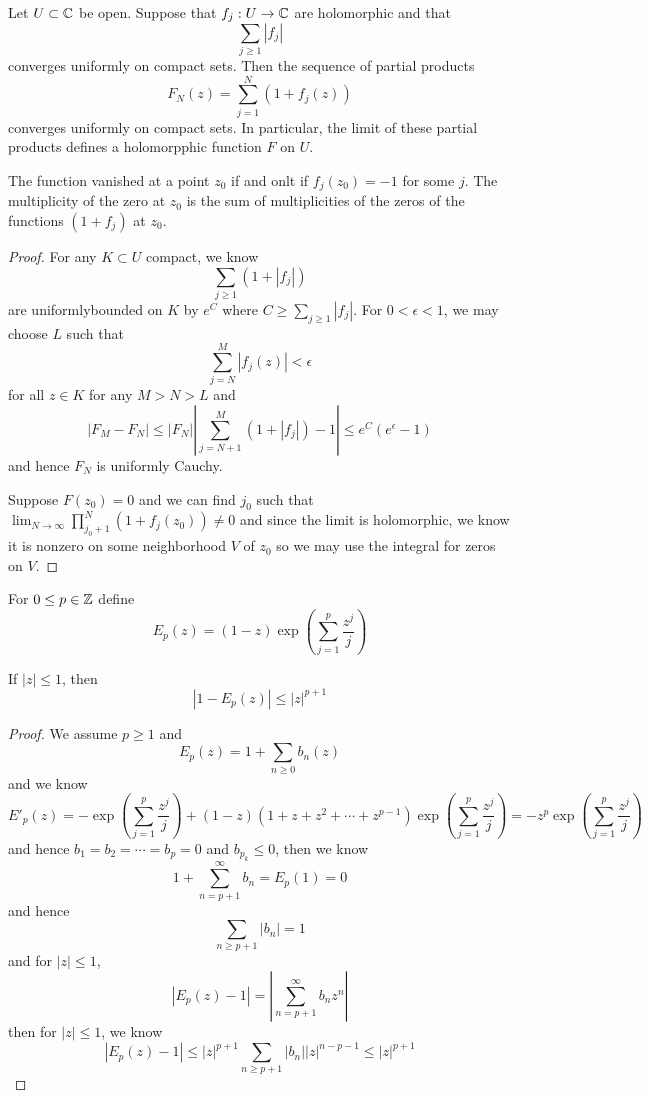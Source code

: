 \begin{theorem}
    Let $U\subset \mathbb{C}$ be open. Suppose that $f_j : U\to\mathbb{C}$ are holomorphic and that
    \[\sum\limits_{j\geq 1}|f_j|\]
    converges uniformly on compact sets. Then the sequence of partial products
    \[F_N(z) = \sum\limits_{j=1}^N(1+f_j(z))\]
    converges uniformly on compact sets. In particular, the limit of these partial products defines a holomorpphic function $F$ on $U$.\par
    The function vanished at a point $z_0$ if and onlt if $f_j(z_0) = -1$ for some $j$. The multiplicity of the zero at $z_0$ is the sum of multiplicities of the zeros of the functions $(1+f_j)$ at $z_0$.
\end{theorem}
\begin{proof}
    For any $K\subset U$ compact, we know
    \[\sum\limits_{j\geq 1}(1+|f_j|)\]
    are uniformlybounded on $K$ by $e^C$ where $C \geq \sum\limits_{j\geq 1}|f_j|$. For $0<\epsilon < 1$, we may choose $L$ such that
    \[
    \sum\limits_{j=N}^M |f_j(z)| < \epsilon
    \]
    for all $z\in K$ for any $M>N>L$ and 
    \[
    |F_M-F_N| \leq |F_N||\sum\limits_{j=N+1}^{M}(1+|f_j|)-1| \leq e^C(e^{\epsilon} - 1)
    \]
    and hence $F_N$ is uniformly Cauchy.\par
    Suppose $F(z_0) = 0$ and we can find $j_0$ such that $\lim_{N\to\infty} \prod_{j_0+1}^N(1+f_j(z_0)) \neq 0$ and since the limit is holomorphic, we know it is nonzero on some neighborhood $V$ of $z_0$ so we may use the integral for zeros on $V$.
\end{proof}

\begin{definition}
    For $0\leq p \in \mathbb{Z}$ define
    \[E_p(z)  = (1-z)\exp(\sum\limits_{j=1}^p \dfrac{z^j}{j})\]
\end{definition}
\begin{lemma}
    If $|z|\leq 1$, then
    \[|1-E_p(z)| \leq |z|^{p+1}\]
\end{lemma}
\begin{proof}
    We assume $p\geq 1$ and 
    \[
    E_p(z) = 1 + \sum\limits_{n\geq 0} b_n(z)
    \]
    and we know
    \[
    E'_p(z) = -\exp(\sum\limits_{j=1}^p \dfrac{z^j}{j}) + (1-z)(1+z+z^2+\cdots+z^{p-1})\exp(\sum\limits_{j=1}^p \dfrac{z^j}{j}) = -z^p\exp(\sum\limits_{j=1}^p \dfrac{z^j}{j})
    \]
    and hence $b_1 = b_2 = \cdots = b_p = 0$ and $b_{p_k} \leq 0$, then we know
    \[
    1 + \sum\limits_{n = p+1}^{\infty} b_n= E_p(1) = 0
    \]
    and hence
    \[
    \sum\limits_{n\geq p+1} |b_n| = 1 
    \]
    and for $|z|\leq 1$,
    \[
    |E_p(z) - 1| = |\sum\limits_{n=p+1}^{\infty} b_n z^n|
    \]
    then for $|z|\leq 1$, we know
    \[
    |E_p(z) - 1| \leq |z|^{p+1}\sum\limits_{n\geq p+1}|b_n||z|^{n-p-1} \leq |z|^{p+1}
    \]
\end{proof}

